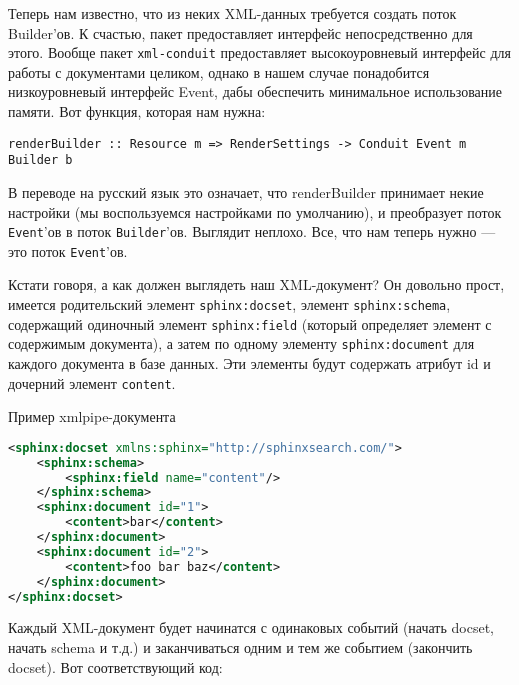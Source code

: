 Теперь нам известно, что из неких XML-данных требуется создать поток Builder'ов. К счастью, пакет  предоставляет интерфейс непосредственно для этого. Вообще пакет \lstinline'xml-conduit' предоставляет высокоуровневый интерфейс для работы с документами целиком, однако в нашем случае понадобится низкоуровневый интерфейс Event, дабы обеспечить минимальное использование памяти. Вот функция, которая нам нужна:

\begin{lstlisting}
renderBuilder :: Resource m => RenderSettings -> Conduit Event m Builder b
\end{lstlisting}

В переводе на русский язык это означает, что renderBuilder принимает некие настройки (мы воспользуемся настройками по умолчанию), и преобразует поток \lstinline!Event!'ов в поток \lstinline!Builder!'ов. Выглядит неплохо. Все, что нам теперь нужно --- это поток \lstinline!Event!'ов.

Кстати говоря, а как должен выглядеть наш XML-документ? Он довольно прост, имеется родительский элемент \lstinline'sphinx:docset', элемент \lstinline'sphinx:schema', содержащий одиночный элемент \lstinline'sphinx:field' (который определяет элемент с содержимым документа), а затем по одному элементу \lstinline'sphinx:document' для каждого документа в базе данных. Эти элементы будут содержать атрибут id и дочерний элемент \lstinline'content'.

\begin{remark}
Пример xmlpipe-документа %
\begin{lstlisting}[language=XML]
<sphinx:docset xmlns:sphinx="http://sphinxsearch.com/">
    <sphinx:schema>
        <sphinx:field name="content"/>
    </sphinx:schema>
    <sphinx:document id="1">
        <content>bar</content>
    </sphinx:document>
    <sphinx:document id="2">
        <content>foo bar baz</content>
    </sphinx:document>
</sphinx:docset>
\end{lstlisting}
\end{remark}

Каждый XML-документ будет начинатся с одинаковых событий (начать docset, начать schema и т.д.) и заканчиваться одним и тем же событием (закончить docset). Вот соответствующий код: %

